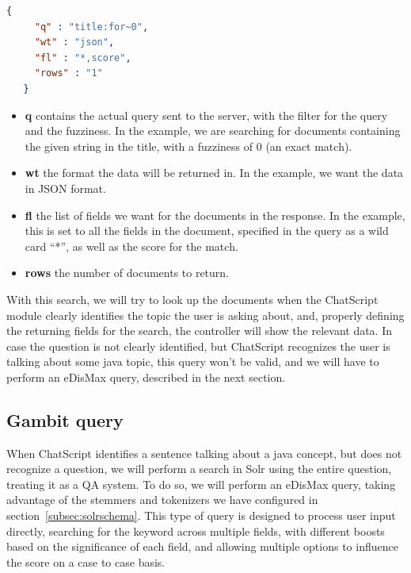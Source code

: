 \begin{center} 
  \begin{lstlisting}[language=json, caption=Example JSON query for Solr, label=listing:solrquery1]
   {
     "q" : "title:for~0",
     "wt" : "json",
     "fl" : "*,score",
     "rows" : "1"
   }  
  \end{lstlisting}
\end{center}

\begin{itemize}
 \item \textbf{q} contains the actual query sent to the server, with the filter for the query and the fuzziness. In the example, we are searching for documents containing the given string in the title, with a fuzziness of 0 (an exact match).
 \item \textbf{wt} the format the data will be returned in. In the example, we want the data in JSON format.
 \item \textbf{fl} the list of fields we want for the documents in the response. In the example, this is set to all the fields in the document, specified in the query as a wild card ``*'', as well as the score for the match.
 \item \textbf{rows} the number of documents to return.
\end{itemize}

With this search, we will try to look up the documents when the ChatScript module clearly identifies the topic the user is asking about, and, properly defining the returning fields for the search, the controller will show the relevant data. In case the question is not clearly identified, but ChatScript recognizes the user is talking about some java topic, this query won't be valid, and we will have to perform an \ac{eDisMax} query, described in the next section.

\subsection{Gambit query}
\label{subsec:solrgambit}

When ChatScript identifies a sentence talking about a java concept, but does not recognize a question, we will perform a search in Solr using the entire question, treating it as a \ac{QA} system. To do so, we will perform an \ac{eDisMax} query, taking advantage of the stemmers and tokenizers we have configured in section~\ref{subsec:solrschema}. This type of query is designed to process user input directly, searching for the keyword across multiple fields, with different boosts based on the significance of each field, and allowing multiple options to influence the score on a case to case basis.

